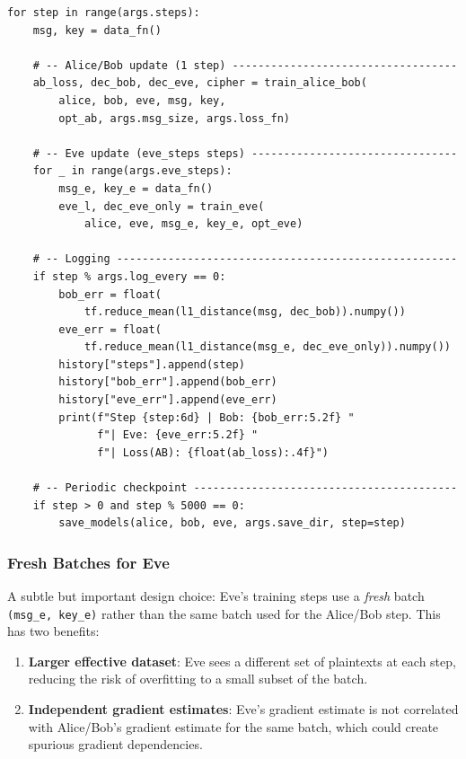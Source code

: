 \documentclass[12pt, a4paper]{article}
\newcommand{\code}[1]{\texttt{\color{CodeRed}#1}}
\begin{document}
\begin{lstlisting}[caption={The complete training loop in \code{main()}}]
for step in range(args.steps):
    msg, key = data_fn()

    # -- Alice/Bob update (1 step) -----------------------------------
    ab_loss, dec_bob, dec_eve, cipher = train_alice_bob(
        alice, bob, eve, msg, key,
        opt_ab, args.msg_size, args.loss_fn)

    # -- Eve update (eve_steps steps) --------------------------------
    for _ in range(args.eve_steps):
        msg_e, key_e = data_fn()
        eve_l, dec_eve_only = train_eve(
            alice, eve, msg_e, key_e, opt_eve)

    # -- Logging -----------------------------------------------------
    if step % args.log_every == 0:
        bob_err = float(
            tf.reduce_mean(l1_distance(msg, dec_bob)).numpy())
        eve_err = float(
            tf.reduce_mean(l1_distance(msg_e, dec_eve_only)).numpy())
        history["steps"].append(step)
        history["bob_err"].append(bob_err)
        history["eve_err"].append(eve_err)
        print(f"Step {step:6d} | Bob: {bob_err:5.2f} "
              f"| Eve: {eve_err:5.2f} "
              f"| Loss(AB): {float(ab_loss):.4f}")

    # -- Periodic checkpoint -----------------------------------------
    if step > 0 and step % 5000 == 0:
        save_models(alice, bob, eve, args.save_dir, step=step)
\end{lstlisting}

\subsubsection*{Fresh Batches for Eve}

A subtle but important design choice: Eve's training steps use a
\emph{fresh} batch \code{(msg\_e, key\_e)} rather than the same batch
used for the Alice/Bob step. This has two benefits:

\begin{enumerate}[leftmargin=2em, itemsep=3pt]
  \item \textbf{Larger effective dataset}: Eve sees a different set of
        plaintexts at each step, reducing the risk of overfitting to
        a small subset of the batch.
  \item \textbf{Independent gradient estimates}: Eve's gradient estimate
        is not correlated with Alice/Bob's gradient estimate for the
        same batch, which could create spurious gradient dependencies.
\end{enumerate}
\end{document}
